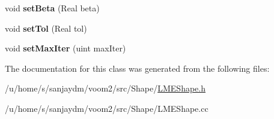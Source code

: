\begin{DoxyCompactItemize}
\item 
\hypertarget{classvoom_1_1_l_m_e_shape_a9cc76717eaf84d2bbd1a738ef675a768}{
void {\bfseries setBeta} (Real beta)}
\label{classvoom_1_1_l_m_e_shape_a9cc76717eaf84d2bbd1a738ef675a768}

\item 
\hypertarget{classvoom_1_1_l_m_e_shape_a57640a3f7493096c0afdfaab0e5279e1}{
void {\bfseries setTol} (Real tol)}
\label{classvoom_1_1_l_m_e_shape_a57640a3f7493096c0afdfaab0e5279e1}

\item 
\hypertarget{classvoom_1_1_l_m_e_shape_ac710c43a96fb4e9cb77c308d87bf0ce0}{
void {\bfseries setMaxIter} (uint maxIter)}
\label{classvoom_1_1_l_m_e_shape_ac710c43a96fb4e9cb77c308d87bf0ce0}

\end{DoxyCompactItemize}


The documentation for this class was generated from the following files:\begin{DoxyCompactItemize}
\item 
/u/home/s/sanjaydm/voom2/src/Shape/\hyperlink{_l_m_e_shape_8h}{LMEShape.h}\item 
/u/home/s/sanjaydm/voom2/src/Shape/LMEShape.cc\end{DoxyCompactItemize}
